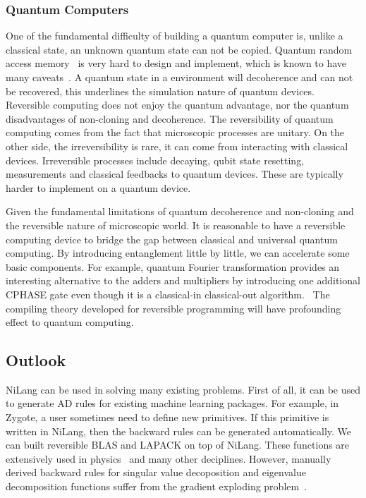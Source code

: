 \documentclass[aps,twocolumn,longbibliography,english,superscriptaddress]{revtex4-1}
\newcommand{\<}{\langle}
\renewcommand{\>}{\rangle}
\theoremstyle{definition}\newtheorem{definition}{\textit{Definition}}
\begin{document}
\subsubsection{Quantum Computers}\label{sec:qc}
One of the fundamental difficulty of building a quantum computer is, unlike a classical state, an unknown quantum state can not be copied.
Quantum random access memory~\cite{Giovannetti2008} is very hard to design and implement, which is known to have many caveats~\cite{Aaronson2015}.
A quantum state in a environment will decoherence and can not be recovered, this underlines the simulation nature of quantum devices.
Reversible computing does not enjoy the quantum advantage, nor the quantum disadvantages of non-cloning and decoherence.
The reversibility of quantum computing comes from the fact that microscopic processes are unitary.
On the other side, the irreversibility is rare, it can come from interacting with classical devices. Irreversible processes include decaying, qubit state resetting, measurements and classical feedbacks to quantum devices. These are typically harder to implement on a quantum device.

Given the fundamental limitations of quantum decoherence and non-cloning and the reversible nature of microscopic world.
It is reasonable to have a reversible computing device to bridge the gap between classical and universal quantum computing.
By introducing entanglement little by little, we can accelerate some basic components. For example, quantum Fourier transformation provides an interesting alternative to the adders and multipliers by introducing one additional CPHASE gate even though it is a classical-in classical-out algorithm.~\cite{RuizPerez2017}
The compiling theory developed for reversible programming will have profounding effect to quantum computing.

\subsection{Outlook}\label{sec:outlook}
NiLang can be used in solving many existing problems.
First of all, it can be used to generate AD rules for existing machine learning packages.
For example, in Zygote, a user sometimes need to define new primitives.
If this primitive is written in NiLang, then the backward rules can be generated automatically.
We can built reversible BLAS and LAPACK on top of NiLang.
These functions are extensively used in physics~\cite{Xie2020,Liao2019} and many other deciplines. However, manually derived backward rules for singular value decoposition and eigenvalue decomposition functions suffer from the gradient exploding problem~\cite{Seeger2017,Wan2019,Hubig2019}.
\end{document}
